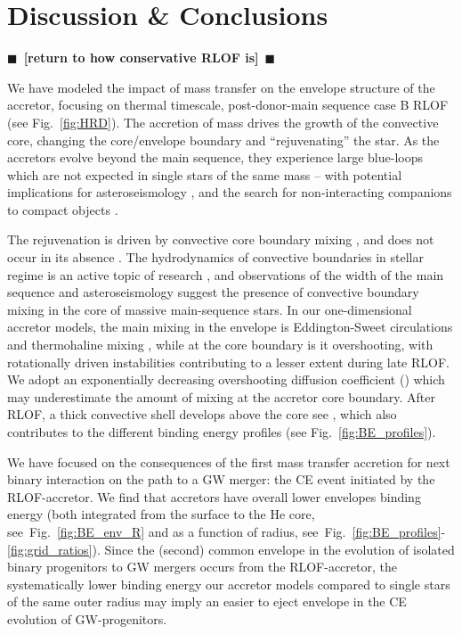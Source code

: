 \documentclass[twocolumn,twocolappendix,trackchanges]{aastex63}
\DeclareRobustCommand{\Figref}[1]{Fig.~\ref{#1}}
\newcommand{\todo}[1]{{\large $\blacksquare$~\textbf{\color{red}[#1]}}~$\blacksquare$}
\begin{document}
\section{Discussion \& Conclusions}
\label{sec:conclusions}

\todo{return to how conservative RLOF is}

We have modeled the impact of mass transfer on the envelope structure
of the accretor, focusing on thermal timescale, post-donor-main
sequence case B RLOF (see \Figref{fig:HRD}). The accretion of mass
drives the growth of the convective core, changing the core/envelope
boundary and ``rejuvenating'' the star. As the accretors evolve
beyond the main sequence, they experience large blue-loops which are
not expected in single stars of the same mass -- with potential
implications for asteroseismology \citep[e.g.,][]{dorn-wallenstein:20},
and the search for non-interacting companions to compact objects
\citep[e.g.,][]{breivik:17, andrews:19, chawla:21}.

The rejuvenation is driven by convective core boundary mixing
\citep[e.g.,][]{hellings:1983, hellings:1984, renzo:2021zoph}, and
does not occur in its absence \citep{braun:95}. The hydrodynamics of
convective boundaries in stellar regime is an active topic of research
\citep[e.g.,][]{anders:22a, anders:22b}, and observations of the width
of the main sequence \citep[e.g.,][]{brott:11} and asteroseismology
\citep[e.g.,][]{moravveji:16} suggest the presence of convective
boundary mixing in the core of massive main-sequence stars. In our
one-dimensional accretor models, the main mixing in the envelope is
Eddington-Sweet circulations and thermohaline mixing
\citep{renzo:2021zoph}, while at the core boundary is it overshooting,
with rotationally driven instabilities contributing to a lesser extent
during late RLOF. We adopt an exponentially decreasing overshooting
diffusion coefficient (\citealt{claret:17}) which may underestimate
the amount of mixing at the accretor core boundary. After RLOF, a
thick convective shell develops above the core see
\citep[see][]{renzo:2021zoph}, which also contributes to the different
binding energy profiles (see \Figref{fig:BE_profiles}).

We have focused on the consequences of the first mass transfer
accretion for next binary interaction on the path to a GW merger: the
CE event initiated by the RLOF-accretor. We find that accretors have
overall lower envelopes binding energy (both integrated from the
surface to the He core, see~\Figref{fig:BE_env_R} and as a function of
radius, see~\Figref{fig:BE_profiles}-\ref{fig:grid_ratios}). Since the
(second) common envelope in the evolution of isolated binary
progenitors to GW mergers occurs from the RLOF-accretor, the
systematically lower binding energy our accretor models compared to
single stars of the same outer radius may imply an easier to eject
envelope in the CE evolution of GW-progenitors.
\end{document}
